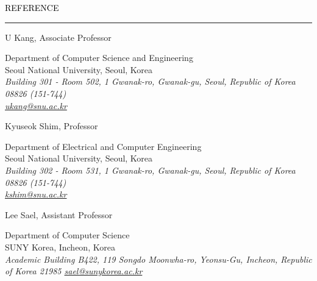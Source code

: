 \documentclass{resume} %
\renewenvironment{rSection}[1]{
	\sectionskip
	\textcolor{Black}{\MakeUppercase{#1}}
	\sectionlineskip
	\hrule
	\begin{list}{}{
			\setlength{\leftmargin}{1.5em}
		}
		\item[]
	}{
	\end{list}
}
\begin{document}
	\begin{rSection}{Reference}
		\vspace{1mm}		
	\begin{rSubsection}{U Kang, Associate Professor}{}{}{}
		\item Department of Computer Science and Engineering\\
		Seoul National University, Seoul, Korea\\
		\em Building 301 - Room 502, 1 Gwanak-ro, Gwanak-gu, Seoul, Republic of Korea 08826 (151-744) \em \\
		\href{mailto:ukang@snu.ac.kr}{\textit{ukang@snu.ac.kr}}
	\end{rSubsection}
	\vspace{-2mm}		
	\begin{rSubsection}{Kyuseok Shim, Professor}{}{}{}
		\item Department of Electrical and Computer Engineering\\
		Seoul National University, Seoul, Korea\\
		\em Building 302 - Room 531, 1 Gwanak-ro, Gwanak-gu, Seoul, Republic of Korea 08826 (151-744) \em \\
		\href{mailto:kshim@snu.ac.kr}{\textit{kshim@snu.ac.kr}}
	\end{rSubsection}
	\vspace{-2mm}		
	\begin{rSubsection}{Lee Sael, Assistant Professor}{}{}{}
		\item Department of Computer Science\\
		SUNY Korea, Incheon, Korea\\
		\em Academic Building B422, 119 Songdo Moonwha-ro, Yeonsu-Gu, Incheon, Republic of Korea 21985
		\href{mailto:sael@sunykorea.ac.kr}{\textit{sael@sunykorea.ac.kr}}
	\end{rSubsection}
				
	\end{rSection}
		
	
\end{document}
